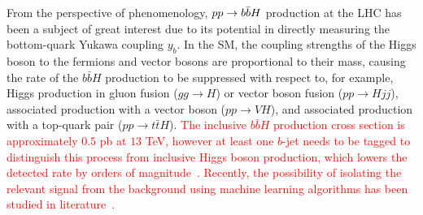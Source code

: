 \documentclass[main.tex]{subfiles}
\begin{document}
\begin{enumerate}
From the perspective of phenomenology, $pp \rightarrow b\bar{b}H$ production at the LHC has been a subject of great interest due to its
potential in directly measuring the bottom-quark Yukawa coupling $y_b$.
In the SM, the coupling strengths of the Higgs boson to the fermions and vector bosons are proportional to their mass, causing the rate of the $b\bar{b}H$ production to be suppressed with respect to, for example,
Higgs production in gluon fusion ($gg\to H$) or vector boson fusion ($pp\to Hjj$), associated
production with a vector boson ($pp\to VH$), and associated production with a top-quark pair ($pp\to
t\bar{t}H$). 
\textcolor{red}{The inclusive $b \bar{b} H$ production cross section is approximately $0.5$ pb at $13$ TeV, however at least one $b$-jet needs to be tagged to distinguish this process from inclusive Higgs boson production, which lowers the detected rate by orders of magnitude~\cite{Pagani:2020rsg}. Recently, the possibility of isolating the relevant signal from the background using machine learning algorithms has been studied in literature~\cite{Grojean:2020ech, Konar:2021nkk}.}


\end{enumerate}
\end{document}
